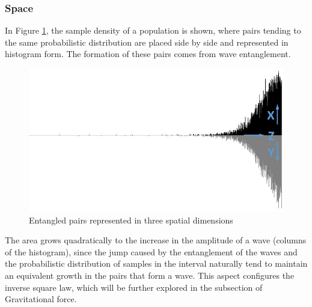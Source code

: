 \subsubsection{Space}
In Figure \ref{fig:consciousness_space_waves}, the sample density of a population is shown, where pairs tending to the same probabilistic distribution are placed side by side and represented in histogram form. The formation of these pairs comes from wave entanglement.
	\begin{figure}[H]
	\caption{Entangled pairs represented in three spatial dimensions}
	\label{fig:consciousness_space_waves}
	\centering
	\includegraphics[scale=.7]{sections/images/consciousness_space_waves.jpg}
	\end{figure}

The area grows quadratically to the increase in the amplitude of a wave (columns of the histogram), since the jump caused by the entanglement of the waves and the probabilistic distribution of samples in the interval naturally tend to maintain an equivalent growth in the pairs that form a wave. This aspect configures the inverse square law, which will be further explored in the subsection of Gravitational force.

